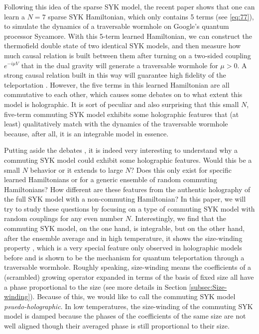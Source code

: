 \documentclass[11pt]{article}
\renewcommand{\>}{\rangle}
\newcommand{\<}{\langle}
\begin{document}
Following this idea of the sparse SYK model, the recent paper \cite{Jafferis:2022crx} shows that one can learn a $N=7$ sparse SYK Hamiltonian, which only contains 5 terms (see \eqref{eq:77}), to simulate the dynamics of a traversable wormhole on Google's quantum processor Sycamore. With this 5-term learned Hamiltonian, we can construct the thermofield double state of two identical SYK models, and then measure how much causal relation is built between them after turning on a two-sided coupling $e^{-i\mu V}$ that in the dual gravity will generate a traversable wormhole for $\mu>0$. A strong causal relation built in this way will guarantee high fidelity of the teleportation \cite{Gao:2019nyj}. However, the five terms in this learned Hamiltonian are all commutative to each other, which causes some debates \cite{Kobrin:2023rzr,Jafferis:2023moh} on to what extent this model is holographic. It is sort of peculiar and also surprising that this small $N$, five-term commuting SYK model exhibits some holographic features that (at least) qualitatively match with the dynamics of the traversable wormhole because, after all, it is an integrable model in essence.

Putting aside the debates \cite{Kobrin:2023rzr,Jafferis:2023moh}, it is indeed very interesting to understand why a commuting SYK model could exhibit some holographic features. Would this be a small $N$ behavior or it extends to large $N$? Does this only exist for specific learned Hamiltonians or for a generic ensemble of random commuting Hamiltonians? How different are these features from the authentic holography of the full SYK model with a non-commuting Hamiltonian? In this paper, we will try to study these questions by focusing on a type of commuting SYK model with random couplings for any even number $N$. Interestingly, we find that the commuting SYK model, on the one hand, is integrable, but on the other hand, after the ensemble average and in high temperature, it shows the size-winding property \cite{Brown:2019hmk,Nezami:2021yaq}, which is a very special feature only observed in holographic models before and is shown to be the mechanism for quantum teleportation through a traversable wormhole. Roughly speaking, size-winding means the coefficients of a (scrambled) growing operator expanded in terms of the basis of fixed size all have a phase proportional to the size (see more details in Section \ref{subsec:Size-winding}). Because of this, we would like to call the commuting SYK model {\it psuedo-holographic}. In low temperatures, the size-winding of the commuting SYK model is damped because the phases of the coefficients of the same size are not well aligned though their averaged phase is still proportional to their size.
\end{document}
